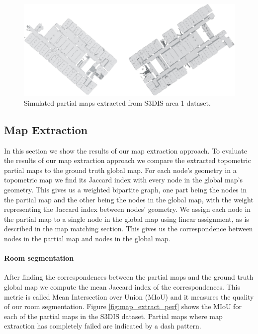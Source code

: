 \begin{figure}[h]
    \centering
    \includegraphics*[width=\textwidth]{./fig/area_1_partial.pdf}
    \caption{Simulated partial maps extracted from S3DIS area 1 dataset.}
    \label{fig:area_1_partial_01}
\end{figure}

\pagebreak

\subsection{Map Extraction}
In this section we show the results of our map extraction approach. To evaluate the results of our map extraction approach we compare the extracted topometric partial maps to the ground truth global map. For each node's geometry in a topometric map we find its Jaccard index with every node in the global map's geometry. This gives us a weighted bipartite graph, one part being the nodes in the partial map and the other being the nodes in the global map, with the weight representing the Jaccard index between nodes' geometry. We assign each node in the partial map to a single node in the global map using linear assignment, as is described in the map matching section. This gives us the correspondence between nodes in the partial map and nodes in the global map.

\paragraph{Room segmentation}
After finding the correspondences between the partial maps and the ground truth global map we compute the mean Jaccard index of the correspondences. This metric is called Mean Intersection over Union (MIoU) and it measures the quality of our room segmentation. Figure \ref{fig:map_extract_perf} shows the MIoU for each of the partial maps in the S3DIS dataset. Partial maps where map extraction has completely failed are indicated by a dash pattern.

